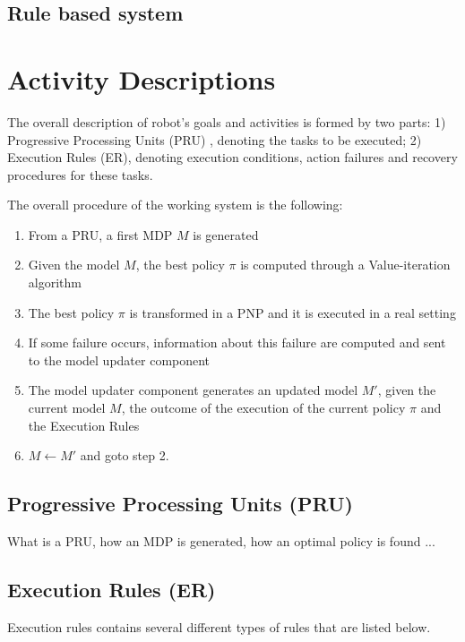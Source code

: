 \subsection{Rule based system}

\section{Activity Descriptions}

The overall description of robot's goals and activities is formed by two parts:
1) Progressive Processing Units (PRU) \cite{CaMoZi01}, denoting the tasks to be executed;
2) Execution Rules (ER), denoting execution conditions, action failures and recovery procedures for these tasks.

The overall procedure of the working system is the following:
\begin{enumerate}
\item From a PRU, a first MDP $M$ is generated 
\item Given the model $M$, the best policy $\pi$ is computed through a Value-iteration algorithm
\item The best policy $\pi$ is transformed in a PNP and it is executed in a real setting
\item If some failure occurs, information about this failure are computed and sent to the model updater component
\item The model updater component generates an updated model $M'$, given the current model $M$, the outcome of the execution of the current policy $\pi$ and the Execution Rules
\item $M \leftarrow M'$ and goto step 2. 
\end{enumerate}



\subsection{Progressive Processing Units (PRU)}

What is a PRU, how an MDP is generated, how an optimal policy is found ...

\subsection{Execution Rules (ER)}

Execution rules contains several different types of rules that are listed below.

\vspace{0.5cm}

